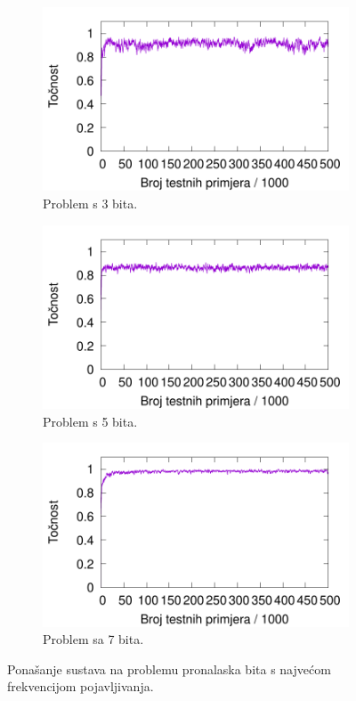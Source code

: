 \documentclass[times, utf8, zavrsni]{fer}
\begin{document}
\begin{figure}[!h]
    \centering
    \begin{subfigure}{0.496\textwidth}
        \centering
        \includegraphics[width=\textwidth]{img/majority/3majre.pdf}
        \caption{Problem s 3 bita.}
        \label{fig:3majre}
    \end{subfigure}
    \begin{subfigure}{0.496\textwidth}
        \centering
        \includegraphics[width=\textwidth]{img/majority/5majre.pdf}
        \caption{Problem s 5 bita.}
        \label{fig:5majre}
    \end{subfigure}
    \begin{subfigure}{0.496\textwidth}
        \centering
        \includegraphics[width=\textwidth]{img/majority/7majre.pdf}
        \caption{Problem sa 7 bita.}
        \label{fig:7majre}
    \end{subfigure}
    \caption{Ponašanje sustava na problemu pronalaska bita s najvećom frekvencijom pojavljivanja.}
    \label{fig:majre}
\end{figure}
\end{document}
